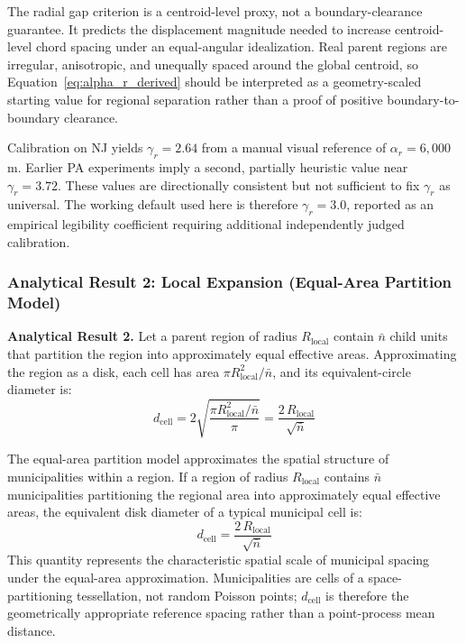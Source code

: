 \documentclass[12pt, a4paper]{article}
\numberwithin{equation}{section}
\begin{document}
The radial gap criterion is a centroid-level proxy, not a boundary-clearance guarantee. It predicts the displacement magnitude needed to increase centroid-level chord spacing under an equal-angular idealization. Real parent regions are irregular, anisotropic, and unequally spaced around the global centroid, so Equation~\eqref{eq:alpha_r_derived} should be interpreted as a geometry-scaled starting value for regional separation rather than a proof of positive boundary-to-boundary clearance.

Calibration on NJ yields $\gamma_r = 2.64$ from a manual visual reference of $\alpha_r = 6{,}000$\,m. Earlier PA experiments imply a second, partially heuristic value near $\gamma_r = 3.72$. These values are directionally consistent but not sufficient to fix $\gamma_r$ as universal. The working default used here is therefore $\gamma_r = 3.0$, reported as an empirical legibility coefficient requiring additional independently judged calibration.

\subsubsection{Analytical Result 2: Local Expansion (Equal-Area Partition Model)}

\begin{mdframed}[linecolor=blue!50!black, linewidth=1pt, topline=true, bottomline=true, rightline=false, leftline=false]
\textbf{Analytical Result 2.} Let a parent region of radius $R_{\text{local}}$ contain $\bar{n}$ child units that partition the region into approximately equal effective areas. Approximating the region as a disk, each cell has area $\pi R^2_{\text{local}} / \bar{n}$, and its equivalent-circle diameter is:
\[
  d_{\text{cell}} = 2\sqrt{\frac{\pi R^2_{\text{local}} / \bar{n}}{\pi}} = \frac{2\,R_{\text{local}}}{\sqrt{\bar{n}}}
\]
\end{mdframed}

\noindent The equal-area partition model approximates the spatial structure of municipalities within a region. If a region of radius $R_{\text{local}}$ contains $\bar{n}$ municipalities partitioning the regional area into approximately equal effective areas, the equivalent disk diameter of a typical municipal cell is:
\begin{equation}
  d_{\text{cell}} = \frac{2\,R_{\text{local}}}{\sqrt{\bar{n}}}
  \label{eq:dcell}
\end{equation}
This quantity represents the characteristic spatial scale of municipal spacing under the equal-area approximation. Municipalities are cells of a space-partitioning tessellation, not random Poisson points; $d_{\text{cell}}$ is therefore the geometrically appropriate reference spacing rather than a point-process mean distance.
\end{document}

